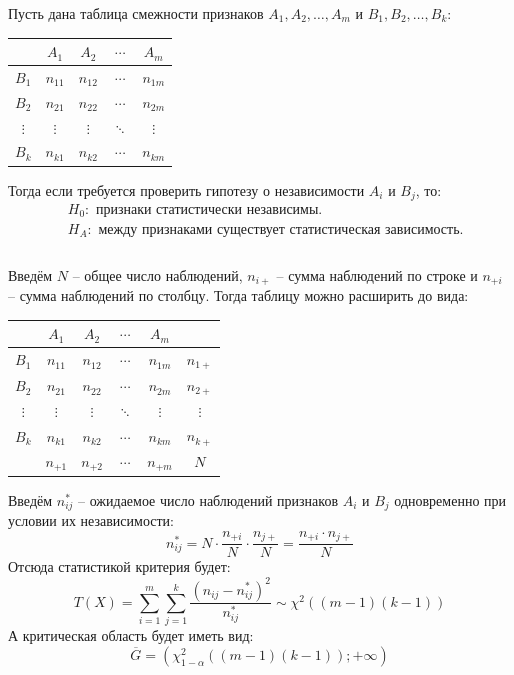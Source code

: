 \documentclass[12pt]{article}
\begin{document}
\begin{statement}
    Пусть дана таблица смежности признаков $A_1,A_2,\ldots,A_m$ и $B_1,B_2,\ldots,B_k$:
    \begin{center}
        \begin{tabular}{c|cccc}
            & $A_1$ & $A_2$ & $\cdots$ & $A_m$\\
            \hline
            $B_1$ & $n_{11}$ & $n_{12}$ & $\cdots$ & $n_{1m}$\\
            $B_2$ & $n_{21}$ & $n_{22}$ & $\cdots$ & $n_{2m}$\\
            $\vdots$ & $\vdots$ & $\vdots$ & $\ddots$ & $\vdots$\\
            $B_k$ & $n_{k1}$ & $n_{k2}$ & $\cdots$ & $n_{km}$\\
        \end{tabular}
    \end{center}
    Тогда если требуется проверить гипотезу о независимости $A_i$ и $B_j$, то:
    \begin{align*}
        &H_0: \text{ признаки статистически независимы.}\\
        &H_A: \text{ между признаками существует статистическая зависимость.}\\
    \end{align*}
    \\[-2\baselineskip]
    Введём $N$ – общее число наблюдений, $n_{i+}$ – сумма наблюдений по строке и $n_{+i}$ – сумма наблюдений по столбцу. Тогда таблицу можно расширить до вида:
    \begin{center}
        \begin{tabular}{c|cccc|c}
            & $A_1$ & $A_2$ & $\cdots$ & $A_m$ &\\
            \hline
            $B_1$ & $n_{11}$ & $n_{12}$ & $\cdots$ & $n_{1m}$ & $n_{1+}$\\
            $B_2$ & $n_{21}$ & $n_{22}$ & $\cdots$ & $n_{2m}$ & $n_{2+}$\\
            $\vdots$ & $\vdots$ & $\vdots$ & $\ddots$ & $\vdots$ & $\vdots$\\
            $B_k$ & $n_{k1}$ & $n_{k2}$ & $\cdots$ & $n_{km}$ & $n_{k+}$\\
            \hline
            & $n_{+1}$ & $n_{+2}$ & $\cdots$ & $n_{+m}$ & $N$
        \end{tabular}
    \end{center}
    Введём $n_{ij}^*$ – ожидаемое число наблюдений признаков $A_i$ и $B_j$ одновременно при условии их независимости:
    $$n_{ij}^*=N\cdot\frac{n_{+i}}{N}\cdot\frac{n_{j+}}{N}=\frac{n_{+i}\cdot n_{j+}}{N}$$
    Отсюда статистикой критерия будет:
    $$T(X)=\sum_{i=1}^{m}\sum_{j=1}^{k}\frac{(n_{ij}-n_{ij}^*)^2}{n_{ij}^*}\sim \chi^2\left((m-1)(k-1)\right)$$
    А критическая область будет иметь вид:
    $$\overline{G}=\left(\chi^2_{1-\alpha}((m-1)(k-1));+\infty\right)$$
\end{statement}
\end{document}
